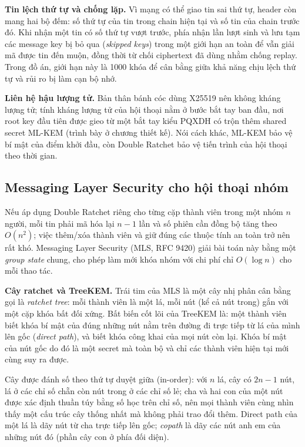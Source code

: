 \textbf{Tin lệch thứ tự và chống lặp.} Vì mạng có thể giao tin sai thứ tự, header còn mang hai bộ đếm: số thứ tự của tin trong chain hiện tại và số tin của chain trước đó. Khi nhận một tin có số thứ tự vượt trước, phía nhận lần lượt sinh và lưu tạm các message key bị bỏ qua (\emph{skipped keys}) trong một giới hạn an toàn để vẫn giải mã được tin đến muộn, đồng thời từ chối ciphertext đã dùng nhằm chống replay. Trong đồ án, giới hạn này là 1000 khóa để cân bằng giữa khả năng chịu lệch thứ tự và rủi ro bị làm cạn bộ nhớ.

\textbf{Liên hệ hậu lượng tử.} Bản thân bánh cóc dùng X25519 nên không kháng lượng tử; tính kháng lượng tử của hội thoại nằm ở bước bắt tay ban đầu, nơi root key đầu tiên được gieo từ một bắt tay kiểu PQXDH có trộn thêm shared secret ML-KEM (trình bày ở chương thiết kế). Nói cách khác, ML-KEM bảo vệ bí mật của điểm khởi đầu, còn Double Ratchet bảo vệ tiến trình của hội thoại theo thời gian.

\subsection{Messaging Layer Security cho hội thoại nhóm}\label{subsec:theory-mls}

Nếu áp dụng Double Ratchet riêng cho từng cặp thành viên trong một nhóm $n$ người, mỗi tin phải mã hóa lại $n-1$ lần và số phiên cần đồng bộ tăng theo $O(n^2)$; việc thêm/xóa thành viên và giữ đúng các thuộc tính an toàn trở nên rất khó. Messaging Layer Security (MLS, RFC 9420) giải bài toán này bằng một \emph{group state} chung, cho phép làm mới khóa nhóm với chi phí chỉ $O(\log n)$ cho mỗi thao tác.

\textbf{Cây ratchet và TreeKEM.} Trái tim của MLS là một cây nhị phân cân bằng gọi là \emph{ratchet tree}: mỗi thành viên là một lá, mỗi nút (kể cả nút trong) gắn với một cặp khóa bất đối xứng. Bất biến cốt lõi của TreeKEM là: một thành viên biết khóa bí mật của đúng những nút nằm trên đường đi trực tiếp từ lá của mình lên gốc (\emph{direct path}), và biết khóa công khai của mọi nút còn lại. Khóa bí mật của nút gốc do đó là một secret mà toàn bộ và chỉ các thành viên hiện tại mới cùng suy ra được.

Cây được đánh số theo thứ tự duyệt giữa (in-order): với $n$ lá, cây có $2n-1$ nút, lá ở các chỉ số chẵn còn nút trong ở các chỉ số lẻ; cha và hai con của một nút được xác định thuần túy bằng số học trên chỉ số, nên mọi thành viên cùng nhìn thấy một cấu trúc cây thống nhất mà không phải trao đổi thêm. Direct path của một lá là dãy nút từ cha trực tiếp lên gốc; \emph{copath} là dãy các nút anh em của những nút đó (phần cây con ở phía đối diện).

